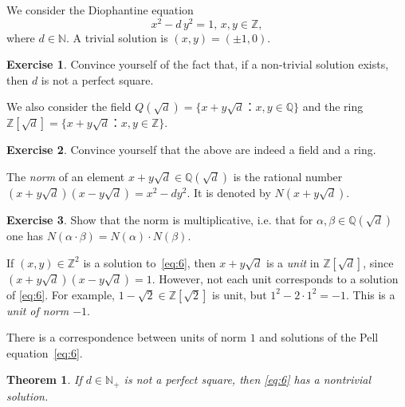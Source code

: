 \documentclass[a4paper,11pt,american]{article}
\theoremstyle{plain}
\newtheorem{theorem}{Theorem}
\theoremstyle{definition}
\newtheorem{exercise}{Exercise}
\begin{document}
We consider the Diophantine equation
\begin{equation}
  \label{eq:6}
  x^2 - d \,y^2  = 1, \, x,y ∈ℤ,
\end{equation}
where $d ∈ ℕ$. A trivial solution is $(x,y) = (\pm 1, 0)$.
\begin{exercise}
  \label{exe:1}
  Convince yourself of the fact that, if a non-trivial solution exists, then $d$ is not a perfect square. 
\end{exercise}

We also consider the field $Q(\sqrt{d}) = \{ x+ y \sqrt{d} ： x,y ∈ℚ \}$ and  the ring $ℤ[ \sqrt{d}] = \{ x+ y \sqrt{d} ： x,y ∈ℤ\}$.
\begin{exercise}
  \label{exe:2}
  Convince yourself that the above are indeed a field and a ring. 
\end{exercise}




The \emph{norm} of an element $x + y \sqrt{d} ∈ ℚ(\sqrt{d})$ is the rational number $(x + y \sqrt{d}) (x - y \sqrt{d} ) = x^2 -d y^2$. It is denoted by $N(x+y\sqrt{d})$. 
\begin{exercise}
  \label{exe:3}
  Show that the norm is multiplicative, i.e. that for $α,β ∈ℚ(\sqrt{d})$ one has $N(α⋅β) = N(α) ⋅N(β)$. 
\end{exercise}


If $(x,y) ∈ℤ^2$ is a solution to~\eqref{eq:6}, then $x + y \sqrt{d}$ is a \emph{unit} in $ℤ[ \sqrt{d}]$, since $(x + y \sqrt{d})(x - y \sqrt{d}) =1$. However, not each unit corresponds to a solution of \eqref{eq:6}. For example, $1 - \sqrt{2} ∈ℤ[\sqrt{2}]$ is  unit, but $1^2 - 2 ⋅ 1^2 = -1$. This is a \emph{unit of norm $-1$}.

There is a correspondence between units of norm $1$ and solutions of the Pell equation~\eqref{eq:6}. 



\begin{theorem}
  \label{thr:4}
  If $d ∈ ℕ_+$ is not a perfect square, then \eqref{eq:6} has a nontrivial solution. 
\end{theorem}
\end{document}
